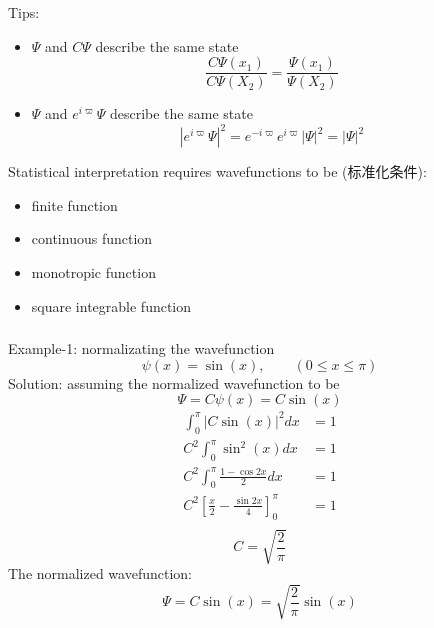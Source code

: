 \begin{frame}
    \frametitle{}
    \alert{Tips:}
    \begin{itemize}
        \item $\Psi$ and $C\Psi$ describe the same state 
        \[ \frac{C\Psi(x_1)}{C\Psi(X_2)} = \frac{\Psi(x_1)}{\Psi(X_2)}\]
        \item $\Psi$ and $e^{i\varpi}\Psi$ describe the same state 
         \[ |e^{i\varpi}\Psi|^2 = e^{-i\varpi} e^{i\varpi} |\Psi|^2 = |\Psi|^2 \] 
    \end{itemize}  
\end{frame}

\begin{frame}
    Statistical interpretation requires wavefunctions to be (标准化条件):
    \begin{itemize}
        \item finite  function
        \item continuous function 
        \item monotropic function
        \item square integrable function 
    \end{itemize}
\end{frame}

\begin{frame}[allowframebreaks=]
    \frametitle{}
    \alert{Example-1:} normalizating the wavefunction \[\psi(x)=\sin(x), \qquad (0\le x \le \pi)\]
    \alert{Solution:} assuming the normalized wavefunction to be 
    \[\Psi=C\psi(x)=C\sin(x)\]
    \begin{equation*}
        \begin{split}
            \int_0 ^\pi |C\sin(x)|^2 dx &=1 \\
            C^2 \int_0 ^\pi \sin^2(x) dx &=1 \\
            C^2 \int_0 ^\pi \frac{1-\cos 2x }{2} dx &=1 \\ 
            C^2 [\frac{x}{2}-\frac{\sin 2x}{4}]_0 ^\pi &=1 \\ 
        \end{split} 
     \end{equation*}
     \[C=\sqrt{\frac{2}{\pi}}\]
     The normalized wavefunction:
     \begin{equation*}
        \Psi=C\sin(x)=\sqrt{\frac{2}{\pi}}\sin(x)
    \end{equation*}
\end{frame}


